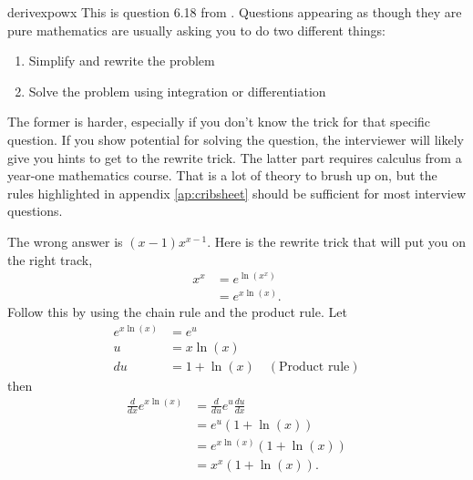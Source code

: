 \begin{answer}{derivexpowx}
This is question 6.18 from \citet{JoshiQA}.
Questions appearing as though they are pure mathematics are usually asking you to do two different things:
\begin{enumerate}
  \item Simplify and rewrite the problem
  \item Solve the problem using integration or differentiation
\end{enumerate}
The former is harder, especially if you don't know the trick for that specific question.
If you show potential for solving the question, the interviewer will likely give you hints to get to the rewrite trick.
The latter part requires calculus from a year-one mathematics course.
That is a lot of theory to brush up on, but the rules highlighted in appendix \ref{ap:cribsheet} should be sufficient for most interview questions.

The wrong answer is $(x-1) x^{x-1}$.
Here is the rewrite trick that will put you on the right track,
\begin{align*}
  x^x &= e^{ \ln(x^x )} \\
      &= e^{x \ln(x )}
      \text{.}
\end{align*}
Follow this by using the chain rule and the product rule. Let
\begin{align*}
      e^{x \ln(x )} &=  e^{u} \\
      u &= x \ln(x) \\
     du &= 1 + \ln(x) \quad (\text{Product rule})
\end{align*}
then
\begin{align*}
\frac{d}{dx} e^{x \ln(x )} &= \frac{d}{du} e^{u}  \frac{du}{dx} \\
                           &=  e^{u} (1 + \ln(x)) \\
                           &=  e^{x \ln(x)} (1 + \ln(x)) \\
                           &=  x^x (1 + \ln(x))
\text{.}
\end{align*}
\end{answer}
